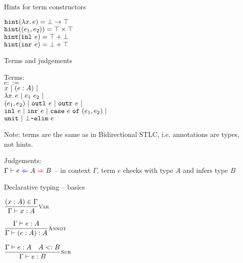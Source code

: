 \documentclass{beamer}
\begin{document}
\begin{frame}{Hints for term constructors}

\begin{center}
  $\hintfor{\fun{x}{e}} = \Fun{\Bot}{\Top}$ \\
  $\texttt{hint}((e_1, e_2)) = \top \times \top$ \\
  $\texttt{hint}(\texttt{inl}_{}\ e) = \top + \bot$ \\
  $\texttt{hint}(\texttt{inr}_{}\ e) = \bot + \top$
\end{center}

\end{frame}

\begin{frame}{Terms and judgements}

Terms: \\
$e ::=$ \\
\qquad $x \ |\  (e : A) \ |\ $ \\
\qquad $\fun{x}{e} \pipe \app{e_1}{e_2} \pipe$ \\
\qquad $(e_1, e_2) \ |\  \texttt{outl}_{}\ e \ |\  \texttt{outr}_{}\ e \ |\ $ \\
\qquad $\texttt{inl}_{}\ e \ |\  \texttt{inr}_{}\ e \ |\  \texttt{case}\ e\ \texttt{of}\ (e_1, e_2) \ |\ $ \\
\qquad $\unit \pipe \botelim[e]$

\vspace{2em}

Note: terms are the same as in Bidirectional STLC, i.e. annotations are types, not hints.

\vspace{2em}

Judgements: \\
$\hinting[\Gamma]{e}{A}{B}$ -- in context $\Gamma$, term $e$ checks with type $A$ and infers type $B$

\end{frame}

\begin{frame}{Declarative typing -- basics}

\begin{center}
  $\infrule[Var]{\sidecond{(x : A) \in \Gamma}}{\typing{x}{A}}$

  \vspace{2em}

  $\infrule[Annot]{\typing{e}{A}}{\typing{\annot{e}{A}}{A}}$

  \vspace{2em}

  $\infrule[Sub]{\typing{e}{A} \quad \sidecond{\subtyping{A}{B}}}{\typing{e}{B}}$
\end{center}

\end{frame}
\end{document}
